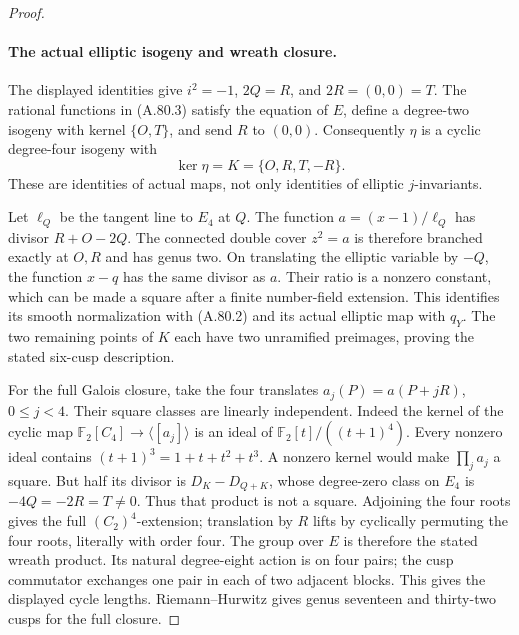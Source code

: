 \begin{proof}
\paragraph{The actual elliptic isogeny and wreath closure.}
The displayed identities give \(i^2=-1\), \(2Q=R\),
and \(2R=(0,0)=T\). The rational functions in (A.80.3)
satisfy the equation of \(E\), define a degree-two isogeny
with kernel \(\{O,T\}\), and send \(R\) to \((0,0)\).
Consequently \(\eta\) is a cyclic degree-four isogeny with
\[
                     \ker\eta=K=\{O,R,T,-R\}.
                                                        \tag{A.80.5}
\]
These are identities of actual maps, not only identities of
elliptic \(j\)-invariants.

Let \(\ell_Q\) be the tangent line to \(E_4\) at \(Q\).
The function \(a=(x-1)/\ell_Q\) has divisor
\(R+O-2Q\). The connected double cover \(z^2=a\) is therefore
branched exactly at \(O,R\) and has genus two. On translating
the elliptic variable by \(-Q\), the function \(x-q\)
has the same divisor as \(a\). Their ratio is a nonzero
constant, which can be made a square after a finite number-field
extension. This identifies its smooth normalization with
(A.80.2) and its actual elliptic map with \(q_Y\).
The two remaining points of \(K\) each have two unramified
preimages, proving the stated six-cusp description.

For the full Galois closure, take the four translates
\(a_j(P)=a(P+jR)\), \(0\le j<4\). Their square classes
are linearly independent. Indeed the kernel of the cyclic
map \(\mathbb F_2[C_4]\to\langle[a_j]\rangle\) is an
ideal of \(\mathbb F_2[t]/((t+1)^4)\). Every nonzero ideal
contains \((t+1)^3=1+t+t^2+t^3\). A nonzero kernel would
make \(\prod_j a_j\) a square. But half its divisor is
\(D_K-D_{Q+K}\), whose degree-zero class on \(E_4\) is
\(-4Q=-2R=T\ne0\). Thus that product is not a square.
Adjoining the four roots gives the full \((C_2)^4\)-extension;
translation by \(R\) lifts by cyclically permuting the four
roots, literally with order four. The group over \(E\) is
therefore the stated wreath product. Its natural degree-eight
action is on four pairs; the cusp commutator exchanges one
pair in each of two adjacent blocks. This gives the displayed
cycle lengths. Riemann--Hurwitz gives genus seventeen and
thirty-two cusps for the full closure.


\end{proof}
